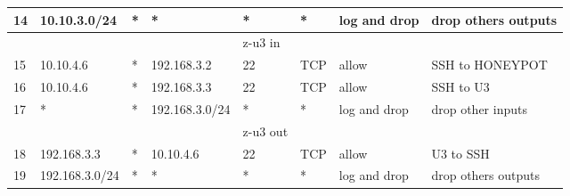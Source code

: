 \documentclass[a4paper, 11pt, oneside]{article}
\begin{document}
\begin{table}[H]
\begin{tabular}{|llllllll|}
  \multicolumn{1}{|l|}{14}           & \multicolumn{1}{l|}{10.10.3.0/24}    & \multicolumn{1}{l|}{*}           & \multicolumn{1}{l|}{*}                    & \multicolumn{1}{l|}{*}           & \multicolumn{1}{l|}{*}                 & \multicolumn{1}{l|}{log and drop}            & drop others outputs \\ \hline
                                    &                                      &                                  &                                           & {\color[HTML]{FE0000} z-u3 in}   &                                        &                                      &                     \\ \hline
  \multicolumn{1}{|l|}{15}           & \multicolumn{1}{l|}{10.10.4.6}       & \multicolumn{1}{l|}{*}           & \multicolumn{1}{l|}{192.168.3.2}          & \multicolumn{1}{l|}{22}          & \multicolumn{1}{l|}{TCP}               & \multicolumn{1}{l|}{allow}           & SSH to HONEYPOT     \\ \hline
  \multicolumn{1}{|l|}{16}           & \multicolumn{1}{l|}{10.10.4.6}       & \multicolumn{1}{l|}{*}           & \multicolumn{1}{l|}{192.168.3.3}          & \multicolumn{1}{l|}{22}          & \multicolumn{1}{l|}{TCP}               & \multicolumn{1}{l|}{allow}           & SSH to U3           \\ \hline
  \multicolumn{1}{|l|}{17}           & \multicolumn{1}{l|}{*}               & \multicolumn{1}{l|}{*}           & \multicolumn{1}{l|}{192.168.3.0/24}       & \multicolumn{1}{l|}{*}           & \multicolumn{1}{l|}{*}                 & \multicolumn{1}{l|}{log and drop}            & drop other inputs   \\ \hline
                                    &                                      &                                  &                                           & {\color[HTML]{FE0000} z-u3 out}  &                                        &                                      &                     \\ \hline
  \multicolumn{1}{|l|}{18}          & \multicolumn{1}{l|}{192.168.3.3}  & \multicolumn{1}{l|}{*}           & \multicolumn{1}{l|}{10.10.4.6}                    & \multicolumn{1}{l|}{22}           & \multicolumn{1}{l|}{TCP}                 & \multicolumn{1}{l|}{allow}            & U3 to SSH \\ \hline
  \multicolumn{1}{|l|}{19}          & \multicolumn{1}{l|}{192.168.3.0/24}  & \multicolumn{1}{l|}{*}           & \multicolumn{1}{l|}{*}                    & \multicolumn{1}{l|}{*}           & \multicolumn{1}{l|}{*}                 & \multicolumn{1}{l|}{log and drop}            & drop others outputs \\ \hline

\end{tabular}
\end{table}
\end{document}
